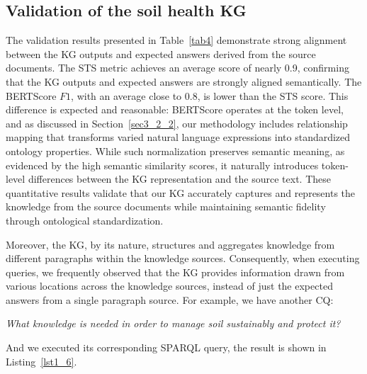 \documentclass[preprint,12pt]{elsarticle}
\begin{document}
\subsection{Validation of the soil health KG}\label{sec5_2}
The validation results presented in Table~\ref{tab4} demonstrate strong alignment between the KG outputs and expected answers derived from the source documents. The STS metric achieves an average score of nearly 0.9, confirming that the KG outputs and expected answers are strongly aligned semantically. The BERTScore $F1$, with an average close to 0.8, is lower than the STS score. This difference is expected and reasonable: BERTScore operates at the token level, and as discussed in Section~\ref{sec3_2_2}, our methodology includes relationship mapping that transforms varied natural language expressions into standardized ontology properties. While such normalization preserves semantic meaning, as evidenced by the high semantic similarity scores, it naturally introduces token-level differences between the KG representation and the source text. These quantitative results validate that our KG accurately captures and represents the knowledge from the source documents while maintaining semantic fidelity through ontological standardization.

Moreover, the KG, by its nature, structures and aggregates knowledge from different paragraphs within the knowledge sources. Consequently, when executing queries, we frequently observed that the KG provides information drawn from various locations across the knowledge sources, instead of just the expected answers from a single paragraph source. For example, we have another CQ:

\textit{What knowledge is needed in order to manage soil sustainably and protect it?}

\noindent And we executed its corresponding SPARQL query, the result is shown in Listing~\ref{lst1_6}.
\end{document}
